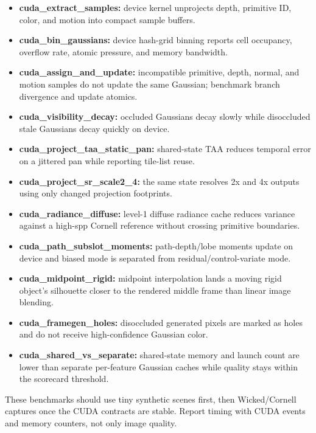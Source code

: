 \documentclass[11pt]{article}
\begin{document}
\begin{itemize}
  \item \textbf{cuda\_extract\_samples:} device kernel unprojects depth,
        primitive ID, color, and motion into compact sample buffers.
  \item \textbf{cuda\_bin\_gaussians:} device hash-grid binning reports cell
        occupancy, overflow rate, atomic pressure, and memory bandwidth.
  \item \textbf{cuda\_assign\_and\_update:} incompatible primitive, depth,
        normal, and motion samples do not update the same Gaussian; benchmark
        branch divergence and update atomics.
  \item \textbf{cuda\_visibility\_decay:} occluded Gaussians decay slowly while
        disoccluded stale Gaussians decay quickly on device.
  \item \textbf{cuda\_project\_taa\_static\_pan:} shared-state TAA reduces
        temporal error on a jittered pan while reporting tile-list reuse.
  \item \textbf{cuda\_project\_sr\_scale2\_4:} the same state resolves 2x and
        4x outputs using only changed projection footprints.
  \item \textbf{cuda\_radiance\_diffuse:} level-1 diffuse radiance cache
        reduces variance against a high-spp Cornell reference without crossing
        primitive boundaries.
  \item \textbf{cuda\_path\_subslot\_moments:} path-depth/lobe moments update
        on device and biased mode is separated from residual/control-variate
        mode.
  \item \textbf{cuda\_midpoint\_rigid:} midpoint interpolation lands a moving
        rigid object's silhouette closer to the rendered middle frame than
        linear image blending.
  \item \textbf{cuda\_framegen\_holes:} disoccluded generated pixels are marked
        as holes and do not receive high-confidence Gaussian color.
  \item \textbf{cuda\_shared\_vs\_separate:} shared-state memory and launch
        count are lower than separate per-feature Gaussian caches while quality
        stays within the scorecard threshold.
\end{itemize}

These benchmarks should use tiny synthetic scenes first, then Wicked/Cornell
captures once the CUDA contracts are stable. Report timing with CUDA events and
memory counters, not only image quality.
\end{document}
